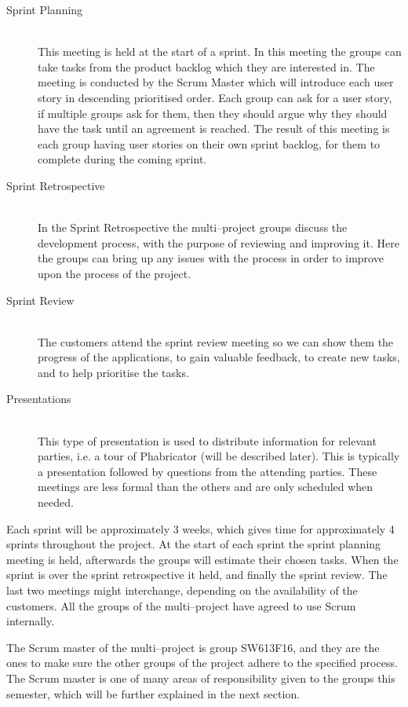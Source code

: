 \begin{description}
	\item[Sprint Planning] \hfill \\
	This meeting is held at the start of a sprint.
	In this meeting the groups can take tasks from the product backlog which they are interested in.
	The meeting is conducted by the Scrum Master which will introduce each user story in descending prioritised order.
	Each group can ask for a user story, if multiple groups ask for them, then they should argue why they should have the task until an agreement is reached.
	The result of this meeting is each group having user stories on their own sprint backlog, for them to complete during the coming sprint.
	\item[Sprint Retrospective] \hfill \\
	In the Sprint Retrospective the multi--project groups discuss the development process, with the purpose of reviewing and improving it.
	Here the groups can bring up any issues with the process in order to improve upon the process of the project.
	\item[Sprint Review] \hfill \\
	The customers attend the sprint review meeting so we can show them the progress of the applications, to gain valuable feedback, to create new tasks, and to help prioritise the tasks.
	\item[Presentations] \hfill \\
	This type of presentation is used to distribute information for relevant parties, i.e. a tour of Phabricator (will be described later).
	This is typically a presentation followed by questions from the attending parties.
	These meetings are less formal than the others and are only scheduled when needed.
\end{description}

Each sprint will be approximately 3 weeks, which gives time for approximately 4 sprints throughout the project.
At the start of each sprint the sprint planning meeting is held, afterwards the groups will estimate their chosen tasks.
When the sprint is over the sprint retrospective it held, and finally the sprint review.
The last two meetings might interchange, depending on the availability of the customers.
All the groups of the multi--project have agreed to use Scrum internally.

The Scrum master of the multi--project is group SW613F16, and they are the ones to make sure the other groups of the project adhere to the specified process.
The Scrum master is one of many areas of responsibility given to the groups this semester, which will be further explained in the next section.

